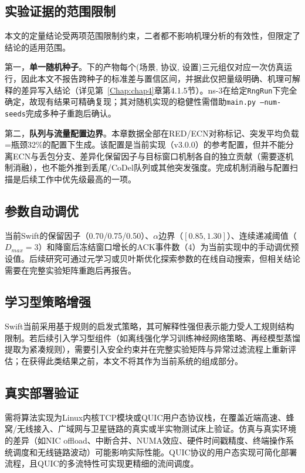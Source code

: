 \subsection{实验证据的范围限制}

本文的定量结论受两项范围限制约束，二者都不影响机理分析的有效性，但限定了结论的适用范围。

第一，\textbf{单一随机种子}。下的产物每个(场景, 协议, 设置)三元组仅对应一次仿真运行，因此本文不报告跨种子的标准差与置信区间，并据此仅把量级明确、机理可解释的差异写入结论（详见第~\ref{Chap:chap4}章第4.1.5节）。ns-3在给定\texttt{RngRun}下完全确定，故现有结果可精确复现；其对随机实现的稳健性需借助\texttt{main.py --num-seeds}完成多种子重跑后确认。

第二，\textbf{队列与流量配置边界}。本章数据全部在RED/ECN对称标记、突发平均负载=瓶颈32\%的配置下生成。该配置是当前实现（v3.0.0）的参考配置，但并不能分离ECN与丢包分支、差异化保留因子与目标窗口机制各自的独立贡献（需要逐机制消融），也不能外推到丢尾/CoDel队列或其他突发强度。完成机制消融与配置扫描是后续工作中优先级最高的一项。

\subsection{参数自动调优}

当前Swift的保留因子（0.70/0.75/0.50）、$\alpha$边界（$[0.85,1.30]$）、连续递减阈值（$D_{max}=3$）和降窗后冻结窗口增长的ACK事件数（4）为当前实现中的手动调优预设值。后续研究可通过元学习或贝叶斯优化探索参数的在线自动搜索，但相关结论需要在完整实验矩阵重跑后再报告。

\subsection{学习型策略增强}

Swift当前采用基于规则的启发式策略，其可解释性强但表示能力受人工规则结构限制。若后续引入学习型组件（如离线强化学习训练神经网络策略、再经模型蒸馏提取为紧凑规则），需要引入安全约束并在完整实验矩阵与异常过滤流程上重新评估；在获得此类结果之前，本文不将其作为当前系统的组成部分。

\subsection{真实部署验证}

需将算法实现为Linux内核TCP模块或QUIC用户态协议栈，在覆盖近端高速、蜂窝/无线接入、广域网与卫星链路的真实或半实物测试床上验证。仿真与真实环境的差异（如NIC offload、中断合并、NUMA效应、硬件时间戳精度、终端操作系统调度和无线链路波动）可能影响实际性能。QUIC协议的用户态实现可简化部署流程，且QUIC的多流特性可实现更精细的流间调度。


